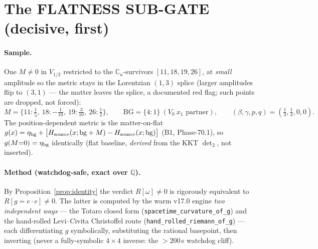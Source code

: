\documentclass[11pt]{article}
\newcommand{\Q}{\mathbb{Q}}
\newcommand{\eu}{e}
\newcommand{\om}{\omega}
\theoremstyle{definition}\newtheorem{remark}{Remark}
\theoremstyle{plain}\newtheorem{proposition}{Proposition}
\begin{document}
\section{The FLATNESS SUB-GATE (decisive, first)}\label{sec:gate}
\paragraph{Sample.} One $M\neq0$ in $V_{1/2}$ restricted to the $\mathbb{C}_u$-survivors
$[11,18,19,26]$, at \emph{small} amplitude so the metric stays in the Lorentzian $(1,3)$ splice
(larger amplitudes flip to $(3,1)$ --- the matter leaves the splice, a documented red flag; such
points are dropped, not forced):
\[
  M=\{11:\tfrac15,\ 18:-\tfrac1{10},\ 19:\tfrac3{10},\ 26:\tfrac12\},\qquad
  \mathrm{BG}=\{4:1\}\ (V_0\ x_1\text{ partner}),\qquad (\beta,\gamma,p,q)=(\tfrac13,\tfrac13,0,0).
\]
The position-dependent metric is the matter-on-flat
$g(x)=\eta_{\rm bg}+\bigl[H_{\rm source}(x;{\rm bg}+M)-H_{\rm source}(x;{\rm bg})\bigr]$ (B1, Phase-70.1),
so $g(M{=}0)=\eta_{\rm bg}$ identically (flat baseline, \emph{derived} from the KKT $\det_2$, not inserted).

\paragraph{Method (watchdog-safe, exact over $\Q$).}
By Proposition~\ref{prop:identity} the verdict $R[\om]\neq0$ is rigorously equivalent to
$R[g{=}\eu\cdot\eu]\neq0$. The latter is computed by the warm v17.0 engine
\emph{two independent ways} --- the Totaro closed form (\texttt{spacetime\_curvature\_of\_g}) and the
hand-rolled Levi--Civita Christoffel route (\texttt{hand\_rolled\_riemann\_of\_g}) --- each
differentiating $g$ symbolically, substituting the rational basepoint, then inverting (never a
fully-symbolic $4\times4$ inverse: the $>\!200$\,s watchdog cliff).
\end{document}
